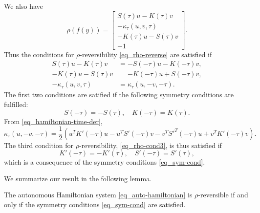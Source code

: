 \documentclass[11pt]{article}
\begin{document}
We also have
\[
\rho(f(y)) =
\begin{bmatrix}
  S(\tau) u - K(\tau)v\\
  -\kappa_\tau(u,v,\tau)\\
  -K(\tau) u - S(\tau) v\\
  -1
\end{bmatrix}.
\]
Thus the conditions for $\rho$-reversibility \eqref{eq_rho-reverse} are satisfied if
\begin{align}
S(\tau) u - K(\tau)v &= -S(-\tau) u - K(-\tau)v,\\
%
-K(\tau) u - S(\tau) v &= -K(-\tau) u + S(-\tau) v,\\
-\kappa_\tau(u,v,\tau) &= \kappa_\tau(u,-v,-\tau).\label{eq_rho-cond3}
\end{align}
The first two conditions are satified if the following symmetry conditions are fulfilled:
\begin{equation}\label{eq_sym-cond}
S(-\tau) = - S(\tau),\quad K(-\tau) = K(\tau).
\end{equation}
From \eqref{eq_hamiltonian-time-der},
\[
\kappa_\tau(u,-v,-\tau) =
\frac{1}{2}
\left(
  u^T K'(-\tau)u - u^TS'(-\tau)v -  v^T S'^T(-\tau)u +  v^T K'(-\tau)v
\right).
\]
The third condition for $\rho$-reversibility, \eqref{eq_rho-cond3}, is thus satisfied if
\[
K'(-\tau) = -K'(\tau),\quad S'(-\tau) = S'(\tau),
\]
which is a consequence of the symmetry conditions \eqref{eq_sym-cond}.

We summarize our result in the following lemma.
\begin{lemma}
  The autonomous Hamiltonian system \eqref{eq_auto-hamiltonian} is $\rho$-reversible if and only if
  the symmetry conditions \eqref{eq_sym-cond} are satisfied.
\end{lemma}


  
\end{document}
